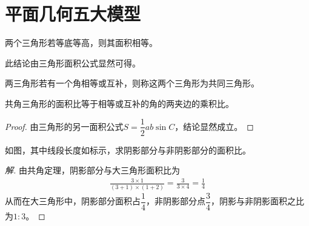
\chapter{平面几何五大模型}
\label{chap:five-models-in-geometry}


\begin{theorem}
  两个三角形若等底等高，则其面积相等。
\end{theorem}

此结论由三角形面积公式显然可得。

\begin{definition}[共角三角形]
  两三角形若有一个角相等或互补，则称这两个三角形为共同三角形。
\end{definition}

\begin{theorem}
  共角三角形的面积比等于相等或互补的角的两夹边的乘积比。
\end{theorem}
\begin{proof}
  由三角形的另一面积公式$S=\dfrac12ab\sin C$，结论显然成立。
\end{proof}

\begin{example}
  如图，其中线段长度如标示，求阴影部分与非阴影部分的面积比。

  \centering
\end{example}
\begin{proof}[解]
  由共角定理，阴影部分与大三角形面积比为
  \begin{align*}
    \frac{3\times 1}{(3+1)\times(1+2)}=\frac{3}{3\times4}=\frac14
  \end{align*}
  从而在大三角形中，阴影部分面积占$\dfrac14$，非阴影部分点$\dfrac34$，阴影与非阴影面积之比为$1:3$。
\end{proof}

